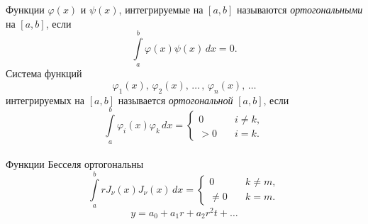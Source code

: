 Функции $\varphi(x)$ и $\psi(x)$, интегрируемые на $[a, b]$ называются \textit{ортогональными} на $[a, b]$, если 
\[	
	\int\limits_a^b \varphi(x) \psi(x)	 \, dx = 0.
\]
Система функций 
\[
	\varphi_1(x),\, \varphi_2(x),\, \ldots\, ,\, \varphi_n(x),\, \ldots
\]
интегрируемых на $[a,b]$ называется \textit{ортогональной} $[a, b]$, если
\[
	\int\limits_a^b \varphi_i (x) \varphi_k\, dx = \left\{
		\begin{aligned} 
			0 &\quad i \neq k,\\ 
			> 0 &\quad i = k.
		\end{aligned} \right.
\]\\

Функции Бесселя ортогональны
\[
	\int\limits_a^b  r J_\nu (x) J_\nu (x)\, dx = \left\{
		\begin{aligned} 
			0 &\quad k \neq m,\\ 
			\neq 0 &\quad k = m.
		\end{aligned} \right.
\]
\[
	y = a_0 + a_1 r + a_2 r^2 t + \ldots
\]


